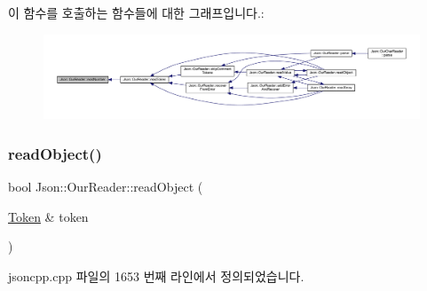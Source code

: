 이 함수를 호출하는 함수들에 대한 그래프입니다.\+:\nopagebreak
\begin{figure}[H]
\begin{center}
\leavevmode
\includegraphics[width=350pt]{class_json_1_1_our_reader_aefcb9a78cc45870ccac2db2a66c8ec50_icgraph}
\end{center}
\end{figure}
\mbox{\label{class_json_1_1_our_reader_aea198f8101dba55099f4d8121a993530}} 
\subsubsection{\texorpdfstring{read\+Object()}{readObject()}}
{\footnotesize\ttfamily bool Json\+::\+Our\+Reader\+::read\+Object (\begin{DoxyParamCaption}\item[{\hyperlink{class_json_1_1_our_reader_1_1_token}{Token} \&}]{token }\end{DoxyParamCaption})\hspace{0.3cm}{\ttfamily [private]}}



jsoncpp.\+cpp 파일의 1653 번째 라인에서 정의되었습니다.


